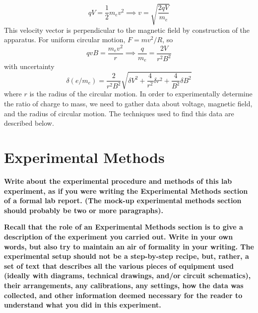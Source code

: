 \documentclass[prX,nofootinbib,notitlepage]{revtex4-1}
\begin{document}
$$
qV = \frac{1}{2} m_{e}v^{2} \implies v = \sqrt{\frac{2qV}{m_{e}}}
$$
This velocity vector is perpendicular to the magnetic field by construction of the apparatus. For uniform circular motion, $F = mv^{2}/R$, so
$$
qvB = \frac{m_{e} v^2 }{r} \implies \frac{q}{m_e} = \frac{2V}{r^2 B^2}
$$
with uncertainty 
$$
\delta (e/m_e) = \frac{2}{r^2 B^2} \sqrt{\delta V^2 + \frac{4}{r^2 }\delta r^2 + \frac{4}{B^2 } \delta B^2}
$$
where $r$ is the radius of the circular motion. In order to experimentally determine the ratio of charge to mass, we need to gather data about voltage, magnetic field, and the radius of circular motion. The techniques used to find this data are described below.

\section{Experimental Methods}

\textbf{
Write about the experimental procedure and methods of this lab experiment, as if you were writing the Experimental Methods section of a formal lab report. (The mock-up experimental methods section should probably be two or more paragraphs).}

\textbf{Recall that the role of an Experimental Methods section is to give a description of the experiment you carried out. Write in your own words, but also try to maintain an air of formality in your writing. The experimental setup should not be a step-by-step recipe, but, rather, a set of text that describes all the various pieces of equipment used (ideally with diagrams, technical drawings, and/or circuit schematics), their arrangements, any calibrations, any settings, how the data was collected, and other information deemed necessary for the reader to understand what you did in this experiment.}

\newpage


\end{document}
